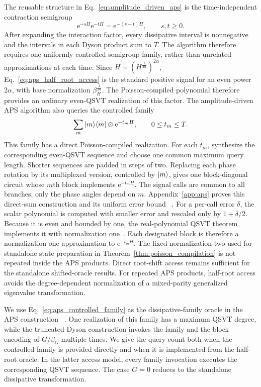 \documentclass[aps,pra,reprint,floatfix,unsortedaddress,superscriptaddress]{revtex4-2}
\begin{document}
The reusable structure in Eq.~\eqref{eq:amplitude_driven_aps} is the
time-independent contraction semigroup
\begin{equation}
    \mathrm e^{-sH}\mathrm e^{-tH}
    =\mathrm e^{-(s+t)H},
    \qquad s,t\geq0.
    \label{eq:aps_semigroup}
\end{equation}
After expanding the interaction factor, every dissipative interval is
nonnegative and the intervals in each Dyson product sum to $T$.  The
algorithm therefore requires one uniformly controlled semigroup family,
rather than unrelated approximations at each time.  Since
$H=(H^{\frac{1}{2\alpha}})^{2\alpha}$,
Eq.~\eqref{eq:aps_half_root_access} is the standard positive signal for
an even power $2\alpha$, with base normalization
$\beta_H^{\frac{1}{2\alpha}}$.  The Poisson-compiled polynomial
therefore provides an ordinary even-QSVT realization of this factor.
The amplitude-driven APS algorithm also queries the
controlled family
\begin{equation}
    \sum_m\ket{m}\!\bra{m}\otimes
    \mathrm e^{-t_mH},
    \qquad 0\leq t_m\leq T.
    \label{eq:aps_controlled_family}
\end{equation}
This family has a direct Poisson-compiled realization.  For each $t_m$,
synthesize the corresponding even-QSVT sequence and choose one common
maximum query length.  Shorter sequences are padded in steps of two.
Replacing
each phase rotation by its multiplexed version, controlled by $\ket m$,
gives one block-diagonal circuit whose $m$th block implements
$\mathrm e^{-t_mH}$.  The signal calls are common to all branches; only
the phase angles depend on $m$.  Appendix~\ref{app:aps} proves this
direct-sum construction and its uniform error bound
~\cite{Gilyen2019qsvt}.
For a per-call error $\delta$, the scalar polynomial is computed with
smaller error and rescaled only by $1+\delta/2$.  Because it is even and
bounded by one, the real-polynomial QSVT theorem implements it with
normalization one~\cite{Gilyen2019qsvt}.  Each designated block is
therefore a normalization-one approximation to
$\mathrm e^{-t_mH}$.  The fixed normalization two used for standalone
state preparation in Theorem~\ref{thm:poisson_compilation} is not
repeated inside the APS products.  Direct root-shift access remains
sufficient for the standalone shifted-oracle results.  For repeated APS
products, half-root access avoids the degree-dependent normalization of
a mixed-parity generalized eigenvalue transformation.

We use Eq.~\eqref{eq:aps_controlled_family} as the dissipative-family
oracle in the APS construction
~\cite{hu2026quantumsimulationnonunitarydynamics}.  One realization of
this family has a maximum QSVT degree, while the truncated Dyson
construction invokes the family and the block encoding of $G/\beta_G$
multiple times.  We give the query count both when the controlled
family is provided directly and when it is implemented from the
half-root oracle.  In the latter access model, every family invocation
executes the corresponding QSVT sequence.
The case $G=0$ reduces to the standalone dissipative transformation.
\end{document}
